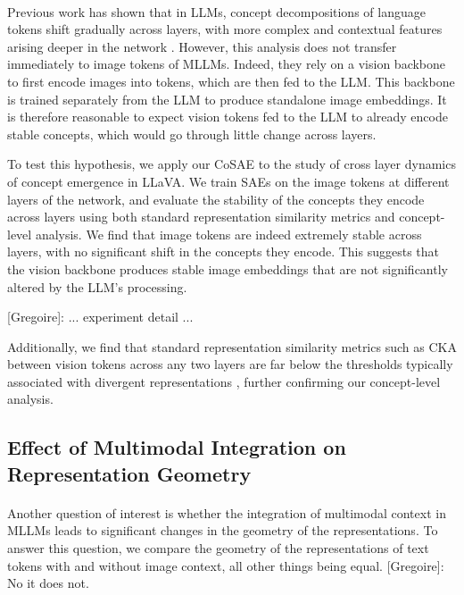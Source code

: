 \documentclass{article}
\newcommand{\greg}[1]{{\color{indigo}[Gregoire]: #1}}
\begin{document}
\paragraph{} Previous work has shown that in LLMs, concept decompositions of language tokens shift gradually across layers, with more complex and contextual features arising deeper in the network \citep{TODO}. However, this analysis does not transfer immediately to image tokens of MLLMs. Indeed, they rely on a vision backbone to first encode images into tokens, which are then fed to the LLM. This backbone is trained separately from the LLM to produce standalone image embeddings. It is therefore reasonable to expect vision tokens fed to the LLM to already encode stable concepts, which would go through little change across layers.

To test this hypothesis, we apply our CoSAE to the study of cross layer dynamics of concept emergence in LLaVA. We train SAEs on the image tokens at different layers of the network, and evaluate the stability of the concepts they encode across layers using both standard representation similarity metrics and concept-level analysis. We find that image tokens are indeed extremely stable across layers, with no significant shift in the concepts they encode. This suggests that the vision backbone produces stable image embeddings that are not significantly altered by the LLM's processing.

\greg{... experiment detail ...}

Additionally, we find that standard representation similarity metrics such as CKA \citep{TODO} between vision tokens across any two layers are far below the thresholds typically associated with divergent representations \citep{TODO}, further confirming our concept-level analysis.

\subsection{Effect of Multimodal Integration on Representation Geometry}

\paragraph{} Another question of interest is whether the integration of multimodal context in MLLMs leads to significant changes in the geometry of the representations. To answer this question, we compare the geometry of the representations of text tokens with and without image context, all other things being equal. \greg{No it does not}.
\end{document}
